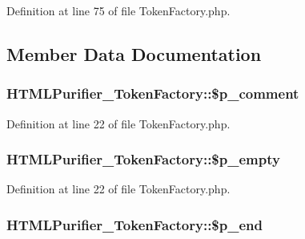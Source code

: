 Definition at line 75 of file Token\+Factory.\+php.



\subsection{Member Data Documentation}
\hypertarget{classHTMLPurifier__TokenFactory_ac43011acb9be11fad3c5da73f4225b47}{
\subsubsection[{\$p\+\_\+comment}]{\setlength{\rightskip}{0pt plus 5cm}H\+T\+M\+L\+Purifier\+\_\+\+Token\+Factory\+::\$p\+\_\+comment}}\label{classHTMLPurifier__TokenFactory_ac43011acb9be11fad3c5da73f4225b47}


Definition at line 22 of file Token\+Factory.\+php.

\hypertarget{classHTMLPurifier__TokenFactory_a4a9636ac8d85fb51748a82f3ac5f9687}{
\subsubsection[{\$p\+\_\+empty}]{\setlength{\rightskip}{0pt plus 5cm}H\+T\+M\+L\+Purifier\+\_\+\+Token\+Factory\+::\$p\+\_\+empty}}\label{classHTMLPurifier__TokenFactory_a4a9636ac8d85fb51748a82f3ac5f9687}


Definition at line 22 of file Token\+Factory.\+php.

\hypertarget{classHTMLPurifier__TokenFactory_a8d28d7ec8c618fec3e847b27615ccce9}{
\subsubsection[{\$p\+\_\+end}]{\setlength{\rightskip}{0pt plus 5cm}H\+T\+M\+L\+Purifier\+\_\+\+Token\+Factory\+::\$p\+\_\+end}}\label{classHTMLPurifier__TokenFactory_a8d28d7ec8c618fec3e847b27615ccce9}



